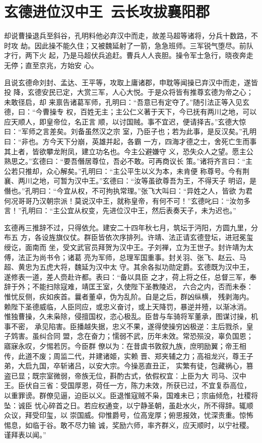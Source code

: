 \chapter{玄德进位汉中王~云长攻拔襄阳郡}

却说曹操退兵至斜谷，孔明料他必弃汉中而走，故差马超等诸将，分兵十数路，不时攻
劫。因此操不能久住；又被魏延射了一箭，急急班师。三军锐气堕尽。前队才行，两下火
起，乃是马超伏兵追赶。曹兵人人丧胆。操令军士急行，晓夜奔走无停；直至京兆，方始安
心。

且说玄德命刘封、孟达、王平等，攻取上庸诸郡，申耽等闻操已弃汉中而走，遂皆投
降，玄德安民已定，大赏三军，人心大悦。于是众将皆有推尊玄德为帝之心；未敢径启，却
来禀告诸葛军师，孔明曰：“吾意已有定夺了。”随引法正等入见玄德，曰：“今曹操专
权，百姓无主；主公仁义著于天下，今已抚有两川之地，可以应天顺人，即皇帝位，名正言
顺，以讨国贼。事不宜迟，便请择吉。”玄德大惊曰：“军师之言差矣。刘备虽然汉之宗
室，乃臣子也；若为此事，是反汉矣。”孔明曰：“非也。方今天下分崩，英雄并起，各霸
一方，四海才德之士，舍死亡生而事其上者，皆欲攀龙附凤，建立功名也。今主公避嫌守
义，恐失众人之望。愿主公熟思之。”玄德曰：“要吾僭居尊位，吾必不敢。可再商议长
策。”诸将齐言曰：“主公若只推却，众心解矣。”孔明曰：“主公平生以义为本，未肯便
称尊号。今有荆襄、两川之地，可暂为汉中王。”玄德曰：“汝等虽欲尊吾为王，不得天子
明诏，是僭也。”孔明曰：“今宜从权，不可拘执常理。”张飞大叫曰：“异姓之人，皆欲
为君何况哥哥乃汉朝宗派！莫说汉中王，就称皇帝，有何不可！”玄德叱曰：“汝勿多
言！”孔明曰：“主公宜从权变，先进位汉中王，然后表奏天子，未为迟也。”

玄德再三推辞不过，只得依允。建安二十四年秋七月，筑坛于沔阳，方圆九里，分布五
方，各设旌旗仪仗。群臣皆依次序排列。许靖、法正请玄德登坛，进冠冕玺绶讫，面南而
坐，受文武官员拜贺为汉中王。子刘禅，立为王世子。封许靖为太傅，法正为尚书令；诸葛
亮为军师，总理军国重事。封关羽、张飞、赵云、马超、黄忠为五虎大将，魏延为汉中太
守。其余各拟功勋定爵。玄德既为汉中王，遂修表一道，差人赍赴许都。表曰：“备以具臣
之才，荷上将之任，总督三军，奉辞于外；不能扫除寇难，靖匡王室，久使陛下圣教陵迟，
六合之内，否而未泰：惟忧反侧，疢如疾首。曩者董卓，伪为乱阶。自是之后，群凶纵横，
残剥海内。赖陛下圣德威临，人臣同应，或忠义奋讨，或上天降罚，暴逆并殪，以渐冰消。
惟独曹操，久未枭除，侵擅国权，恣心极乱。臣昔与车骑将军董承，图谋讨操，机事不密，
承见陷害。臣播越失据，忠义不果，遂得使操穷凶极逆：主后戮杀，皇子鸩害。虽纠合同
盟，念在奋力；懦弱不武，历年未效。常恐殒没，辜负国恩；寤寐永叹，夕惕若厉。今臣群
僚以为：在昔虞书敦叙九族，庶明励翼；帝王相传，此道不废；周监二代，并建诸姬，实赖
晋、郑夹辅之力；高祖龙兴，尊王子弟，大启九国，卒斩诸吕，以安大宗。今操恶直丑正，
实繁有徒，包藏祸心，篡盗已显；既宗室微弱，帝族无位，斟酌古式，依假权宜：上臣为大
司马、汉中王。臣伏自三省：受国厚恩，荷任一方，陈力未效，所获已过，不宜复忝高位，
以重罪谤。群僚见逼，迫臣以义。臣退惟寇贼不枭，国难未已；宗庙倾危，社稷将坠：诚臣
忧心碎首之日。若应权通变，以宁静圣朝，虽赴水火，所不得辞。辄顺众议，拜受印玺，以
崇国威。仰惟爵号，位高宠厚；俯思报效，忧深责重。惊怖惕息，如临于谷。敢不尽力输
诚，奖励六师，率齐群义，应天顺时，以宁社稷。谨拜表以闻。”

